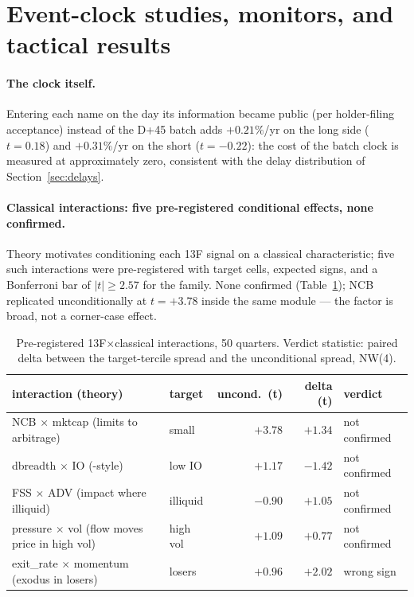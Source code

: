 \section{Event-clock studies, monitors, and tactical results}
\label{sec:tactical}

\paragraph{The clock itself.}
Entering each name on the day its information became public (per
holder-filing acceptance) instead of the D+45 batch adds
$+0.21\%$/yr on the long side ($t=0.18$) and $+0.31\%$/yr on the
short ($t=-0.22$): the cost of the batch clock is measured at
approximately zero, consistent with the delay distribution of
Section~\ref{sec:delays}.

\paragraph{Classical interactions: five pre-registered conditional
effects, none confirmed.}
Theory motivates conditioning each 13F signal on a classical
characteristic; five such interactions were pre-registered with
target cells, expected signs, and a Bonferroni bar of $|t|\ge2.57$
for the family. None confirmed (Table~\ref{tab:inter}); NCB
replicated unconditionally at $t=+3.78$ inside the same module ---
the factor is broad, not a corner-case effect.

\begin{table}[t]
\centering\footnotesize
\caption{Pre-registered 13F$\times$classical interactions, 50
quarters. Verdict statistic: paired delta between the target-tercile
spread and the unconditional spread, NW(4).}
\label{tab:inter}
\begin{tabular}{llrrl}
\toprule
interaction (theory) & target & uncond.\ (t) & delta (t) & verdict \\
\midrule
NCB $\times$ mktcap (limits to arbitrage) & small & $+3.78$ & $+1.34$ & not confirmed \\
dbreadth $\times$ IO (\citealt{nagel2005}-style) & low IO & $+1.17$ & $-1.42$ & not confirmed \\
FSS $\times$ ADV (impact where illiquid) & illiquid & $-0.90$ & $+1.05$ & not confirmed \\
pressure $\times$ vol (flow moves price in high vol) & high vol & $+1.09$ & $+0.77$ & not confirmed \\
exit\_rate $\times$ momentum (exodus in losers) & losers & $+0.96$ & $+2.02$ & wrong sign \\
\bottomrule
\end{tabular}
\end{table}

